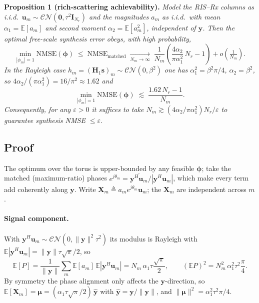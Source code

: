 \medskip
\noindent\textbf{Proposition 1 (rich-scattering achievability).}
\emph{Model the RIS--Rx columns as i.i.d.\ $\mathbf{u}_m\sim\mathcal{CN}(\mathbf{0},\tau^2\mathbf{I}_{N_r})$
and the magnitudes $a_m$ as i.i.d.\ with mean $\alpha_1=\mathbb{E}[a_m]$ and second moment
$\alpha_2=\mathbb{E}[a_m^2]$, independent of $\mathbf{y}$. Then the optimal free-scale synthesis error
obeys, with high probability,}
\begin{equation}
  \boxed{\;
  \min_{|\phi_m|=1}\mathrm{NMSE}(\boldsymbol{\phi})
  \;\le\;\mathrm{NMSE}_{\mathrm{matched}}
  \;\xrightarrow[N_m\to\infty]{}\;
  \frac{1}{N_m}\left(\frac{4\alpha_2}{\pi\alpha_1^2}\,N_r-1\right)+o\!\left(\tfrac1{N_m}\right).
  \;}
  \label{eq:prop}
\end{equation}
\emph{In the Rayleigh case $h_m=(\mathbf{H}_1\mathbf{s})_m\sim\mathcal{CN}(0,\beta^2)$ one has
$\alpha_1^2=\beta^2\pi/4$, $\alpha_2=\beta^2$, so $4\alpha_2/(\pi\alpha_1^2)=16/\pi^2\approx1.62$ and}
\begin{equation}
  \min_{|\phi_m|=1}\mathrm{NMSE}(\boldsymbol{\phi})\;\lesssim\;\frac{1.62\,N_r-1}{N_m}.
  \label{eq:rayleigh}
\end{equation}
\emph{Consequently, for any $\varepsilon>0$ it suffices to take
$N_m\gtrsim (4\alpha_2/\pi\alpha_1^2)N_r/\varepsilon$ to guarantee synthesis NMSE $\le\varepsilon$.}

\subsection{Proof}

The optimum over the torus is upper-bounded by any feasible $\boldsymbol{\phi}$; take the
matched (maximum-ratio) phases $e^{j\theta_m}=\overline{\mathbf{y}^{H}\mathbf{u}_m}/|\mathbf{y}^{H}\mathbf{u}_m|$,
which make every term add coherently along $\mathbf{y}$. Write
$\mathbf{X}_m\triangleq a_m e^{j\theta_m}\mathbf{u}_m$; the $\mathbf{X}_m$ are independent across $m$.

\paragraph{Signal component.} With $\mathbf{y}^{H}\mathbf{u}_m\sim\mathcal{CN}(0,\|\mathbf{y}\|^2\tau^2)$
its modulus is Rayleigh with $\mathbb{E}|\mathbf{y}^{H}\mathbf{u}_m|=\|\mathbf{y}\|\tau\sqrt{\pi}/2$, so
\begin{equation}
  \mathbb{E}[P]=\frac{1}{\|\mathbf{y}\|}\sum_{m}\mathbb{E}[a_m]\,\mathbb{E}|\mathbf{y}^{H}\mathbf{u}_m|
  =N_m\,\alpha_1\tau\frac{\sqrt{\pi}}{2},
  \qquad (\mathbb{E}P)^2=N_m^2\,\alpha_1^2\tau^2\frac{\pi}{4}.
  \label{eq:signal}
\end{equation}
By symmetry the phase alignment only affects the $\mathbf{y}$-direction, so
$\mathbb{E}[\mathbf{X}_m]=\boldsymbol{\mu}=(\alpha_1\tau\sqrt{\pi}/2)\,\hat{\mathbf{y}}$
with $\hat{\mathbf{y}}=\mathbf{y}/\|\mathbf{y}\|$, and $\|\boldsymbol{\mu}\|^2=\alpha_1^2\tau^2\pi/4$.

